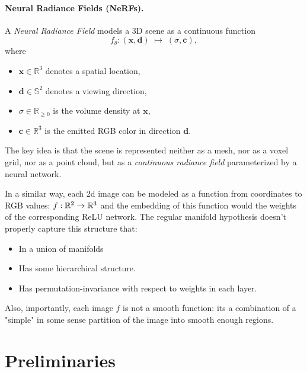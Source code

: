 \documentclass{article}
\begin{document}
\paragraph{Neural Radiance Fields (NeRFs).}
\cite{mildenhall2021nerf, pumarola2021d, 50730, wang2022nerfneuralradiancefields, rabby2024beyondpixelscomprehensivereviewevolution, 9710464, 10.1145/3528223.3530127, 9578751, 9577688, 10.1007/978-3-031-19824-3_20}
A \emph{Neural Radiance Field} models a 3D scene as a continuous function
\[
	f_\theta : (\mathbf{x}, \mathbf{d}) \;\mapsto\; (\sigma, \mathbf{c}),
\]
where
\begin{itemize}
	\item $\mathbf{x} \in \mathbb{R}^3$ denotes a spatial location,
	\item $\mathbf{d} \in \mathbb{S}^2$ denotes a viewing direction,
	\item $\sigma \in \mathbb{R}_{\ge 0}$ is the volume density at $\mathbf{x}$,
	\item $\mathbf{c} \in \mathbb{R}^3$ is the emitted RGB color in direction $\mathbf{d}$.
\end{itemize}

The key idea is that the scene is represented neither as a mesh, nor as a voxel grid,
nor as a point cloud, but as a \emph{continuous radiance field} parameterized by a neural network.

In a similar way, each 2d image can be modeled as a function from coordinates to RGB values: $f: \mathbb{R}^2 \to \mathbb{R}^3$ and the embedding of this function would the weights of the corresponding ReLU network. The regular manifold hypothesis doesn't properly capture this structure that:
\begin{itemize}
	\item In a union of manifolds
	\item Has some hierarchical structure.
	\item Has permutation-invariance with respect to weights in each layer.
\end{itemize}

Also, importantly, each image $f$ is not a smooth function: its a combination of a "simple" in some sense partition of the image into smooth enough regions.



\section{Preliminaries}
\end{document}
